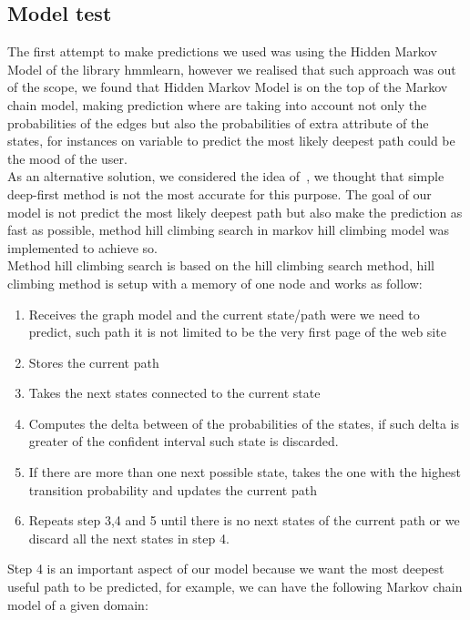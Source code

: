 \subsection{Model test}\label{subsec:model_test}

The first attempt to make predictions we used was using the Hidden Markov Model of the library hmmlearn, however we realised that such approach was out of the scope, we found that Hidden Markov Model is on the top of the Markov chain model, making prediction where are taking into account not only the probabilities of the edges but also the probabilities of extra attribute of the states, for instances on variable to predict the most likely deepest path could be the mood of the user.
\\[2ex]
As an alternative solution, we considered the idea of~\cite{article:markovmodel}, we thought that simple deep-first method is not the most accurate for this purpose. The goal of our model is not predict the most likely deepest path but also make the prediction as fast as possible, method hill climbing search in markov hill climbing model was implemented to achieve so.
\\[2ex]
Method hill climbing search is based  on the hill climbing search method, hill climbing method is setup with a memory of one node and works as follow:

\begin{enumerate}
  \item Receives the graph model and the current state/path were we need to predict, such path it is not limited to be the very first page of the web site
  \item Stores the current path
  \item Takes the next states connected to the current state
  \item Computes the delta between of the probabilities of the states, if such delta is greater of the confident interval such state is discarded.
  \item If there are more than one next possible state, takes the one with the highest transition probability and updates the current path
  \item Repeats step 3,4 and 5 until there is no next states of the current path or we discard all the next states in step 4.
\end{enumerate}

Step 4 is an important aspect of our model because we want the most deepest useful path to be predicted, for example, we can have the following Markov chain model of a given domain:

